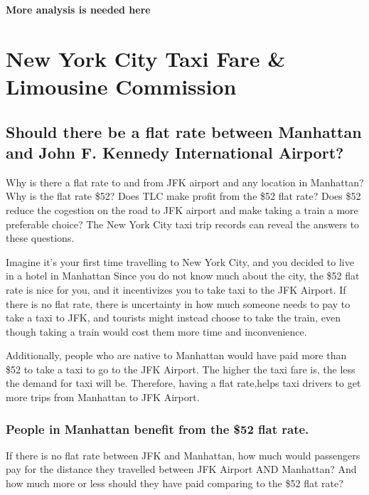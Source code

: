 \documentclass[12pt,twoside]{reedthesis}
\theoremstyle{definition}
\theoremstyle{definition}
\theoremstyle{definition}
\theoremstyle{remark}
\begin{document}
\textbf{More analysis is needed here}

\chapter{New York City Taxi Fare \& Limousine
Commission}\label{chapter5}

\section{Should there be a flat rate between Manhattan and John F.
Kennedy International
Airport?}\label{should-there-be-a-flat-rate-between-manhattan-and-john-f.-kennedy-international-airport}

Why is there a flat rate to and from JFK airport and any location in
Manhattan? Why is the flat rate \$52? Does TLC make profit from the \$52
flat rate? Does \$52 reduce the cogestion on the road to JFK airport and
make taking a train a more preferable choice? The New York City taxi
trip records can reveal the answers to these questions.

Imagine it's your first time travelling to New York City, and you
decided to live in a hotel in Manhattan Since you do not know much about
the city, the \$52 flat rate is nice for you, and it incentivizes you to
take taxi to the JFK Airport. If there is no flat rate, there is
uncertainty in how much someone needs to pay to take a taxi to JFK, and
tourists might instead choose to take the train, even though taking a
train would cost them more time and inconvenience.

Additionally, people who are native to Manhattan would have paid more
than \$52 to take a taxi to go to the JFK Airport. The higher the taxi
fare is, the less the demand for taxi will be. Therefore, having a flat
rate,helps taxi drivers to get more trips from Manhattan to JFK Airport.

\subsection{People in Manhattan benefit from the \$52 flat
rate.}\label{people-in-manhattan-benefit-from-the-52-flat-rate.}

If there is no flat rate between JFK and Manhattan, how much would
passengers pay for the distance they travelled between JFK Airport AND
Manhattan? And how much more or less should they have paid comparing to
the \$52 flat rate?
\end{document}
